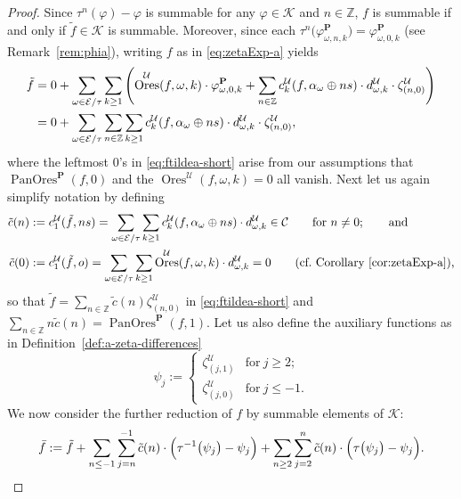 \documentclass[preprint,12pt]{elsarticle}
\numberwithin{equation}{section} %
\theoremstyle{theorem}
\theoremstyle{definition}
\newcommand{\Ca}{\mathcal{C}} %
\newcommand{\bk}{\mathcal{K}} %
\newcommand{\bke}{{\bk}} %
\newcommand{\ec}{\mathcal{E}} %
\newcommand{\idec}{{o}} %
\newcommand{\orbita}{{\ec/\tau}} %
\newcommand{\Z}{\mathbb{Z}} %
\newcommand{\za}[2]{\zeta^{\mathcal{U}}_{( {#1} , {#2} )}}
\DeclareMathOperator{\ores}{Ores}
\DeclareMathOperator{\pano}{PanOres}
\begin{document}
\begin{proof}
    Since $\tau^n(\varphi)-\varphi$ is summable for any $\varphi\in\bke$ and $n\in\Z$, $f$ is summable if and only if $\tilde{f}\in\bke$ is summable. Moreover, since each $\tau^n\bigl(\varphi^\mathbf{P}_{\omega,n,k}\bigr)=\varphi^\mathbf{P}_{\omega,0,k}$ (see Remark~\ref{rem:phia}), writing $f$ as in \eqref{eq:zetaExp-a} yields
    \begin{align} 
        \tilde{f} &=0+\sum_{\omega\in\orbita}\sum_{k\geq 1}\left(\ores^{\mathcal{U}}(f,\omega,k)\cdot \varphi_{\omega,0,k}^{\mathbf{P}}
        + \sum_{n\in\Z}c^\mathcal{U}_k(f,\alpha_\omega\oplus ns)\cdot d^\mathcal{U}_{\omega,k}\cdot\za{n}{0}\right) \notag\\ 
        &= 0+\sum_{\omega\in\orbita}\sum_{n\in\Z}\sum_{k\geq 1}c^\mathcal{U}_k(f,\alpha_\omega\oplus ns)\cdot d^\mathcal{U}_{\omega,k}\cdot\za{n}{0}, \label{eq:ftildea-short}
    \end{align} where the leftmost $0$'s in \eqref{eq:ftildea-short} arise from our assumptions that $\pano^\mathbf{P}(f,0)$ and the $\ores^\mathcal{U}(f,\omega,k)=0$ all vanish. Next let us again simplify notation by defining 
    \begin{align*}\tilde{c}(n)&:=c_1^\mathcal{U}(\tilde{f},ns)=\sum_{\omega\in\orbita}\sum_{k\geq 1}c_k^\mathcal{U}(f,\alpha_{\omega}\oplus ns)\cdot d_{\omega,k}^\mathcal{U}\in\Ca\qquad\text{for} \ n\neq 0;\qquad \text{and} \\ \tilde{c}(0)&:=c_1^\mathcal{U}(\tilde{f},\idec)=\sum_{\omega\in\orbita}\sum_{k\geq 1}\ores^\mathcal{U}(f,\omega,k)\cdot d^\mathcal{U}_{\omega,k}=0\qquad\text{(cf.~Corollary~\ref{cor:zetaExp-a}),}\end{align*}
     so that $\tilde{f} = \sum_{n\in\mathbb{Z}} \tilde{c}(n)\za{n}{0}$ in \eqref{eq:ftildea-short} and $\sum_{n\in\Z} n\tilde{c}(n) = \pano^{\mathbf{P}}(f,1)$. Let us also define the auxiliary functions as in Definition~\ref{def:a-zeta-differences}
    \begin{equation}\label{eq:psia-def}
    \psi_j:=\begin{cases}
        \za{j}{1} & \text{for} \ j\geq 2;\\
        \za{j}{0} & \text{for} \ j\leq-1.
    \end{cases}    
    \end{equation}
    We now consider the further reduction of $f$ by summable elements of $\bke$:
    \begin{equation}\label{eq:fbara-def}\bar{f}:=\tilde{f}+\sum_{n\leq -1}\sum_{j=n}^{-1}\tilde{c}(n)\cdot\Bigl(\tau^{-1}\bigl(\psi_j\bigr)-\psi_j\Bigr)+\sum_{n\geq 2}\sum_{j=2}^n\tilde{c}(n)\cdot \Bigl(\tau\bigl(\psi_j\bigr)-\psi_j\Bigr).

\end{equation}
\end{proof}
\end{document}
